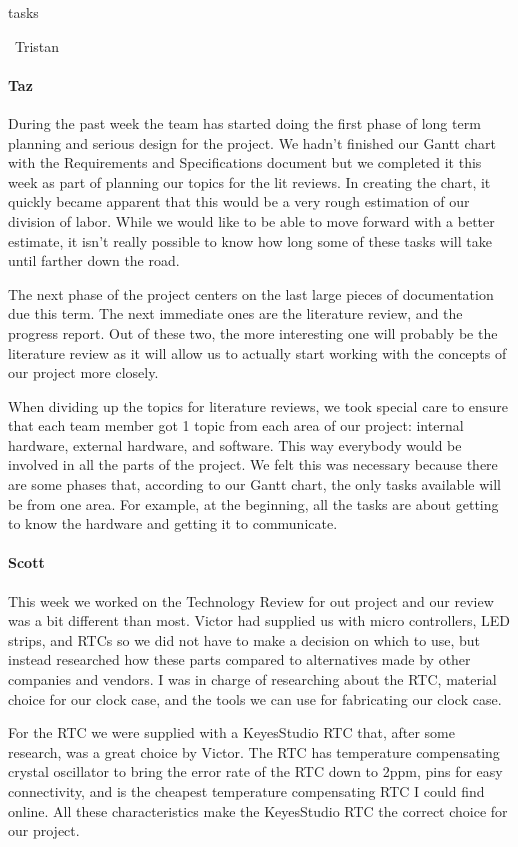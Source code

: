tasks\documentclass[onecolumn, draftclsnofoot,10pt, compsoc]{IEEEtran}
\begin{document}
~Tristan
\paragraph{Taz}
During the past week the team has started doing the first phase of long term planning and serious design for the project. We hadn't finished our Gantt chart with the Requirements and Specifications document but we completed it this week as part of planning our topics for the lit reviews. In creating the chart, it quickly became apparent that this would be a very rough estimation of our division of labor. While we would like to be able to move forward with a better estimate, it isn't really possible to know how long some of these tasks will take until farther down the road.

The next phase of the project centers on the last large pieces of documentation due this term. The next immediate ones are the literature review, and the progress report. Out of these two, the more interesting one will probably be the literature review as it will allow us to actually start working with the concepts of our project more closely.

When dividing up the topics for literature reviews, we took special care to ensure that each team member got 1 topic from each area of our project: internal hardware, external hardware, and software. This way everybody would be involved in all the parts of the project. We felt this was necessary because there are some phases that, according to our Gantt chart, the only tasks available will be from one area. For example, at the beginning, all the tasks are about getting to know the hardware and getting it to communicate.
\paragraph{Scott}
This week we worked on the Technology Review for out project and our review was a bit different than most. Victor had supplied us with micro controllers, LED strips, and RTCs so we did not have to make a decision on which to use, but instead researched how these parts compared to alternatives made by other companies and vendors. I was in charge of researching about the RTC, material choice for our clock case, and the tools we can use for fabricating our clock case.

For the RTC we were supplied with a KeyesStudio RTC that, after some research, was a great choice by Victor. The RTC has temperature compensating crystal oscillator to bring the error rate of the RTC down to 2ppm, pins for easy connectivity, and is the cheapest temperature compensating RTC I could find online. All these characteristics make the KeyesStudio RTC the correct choice for our project.
\end{document}
